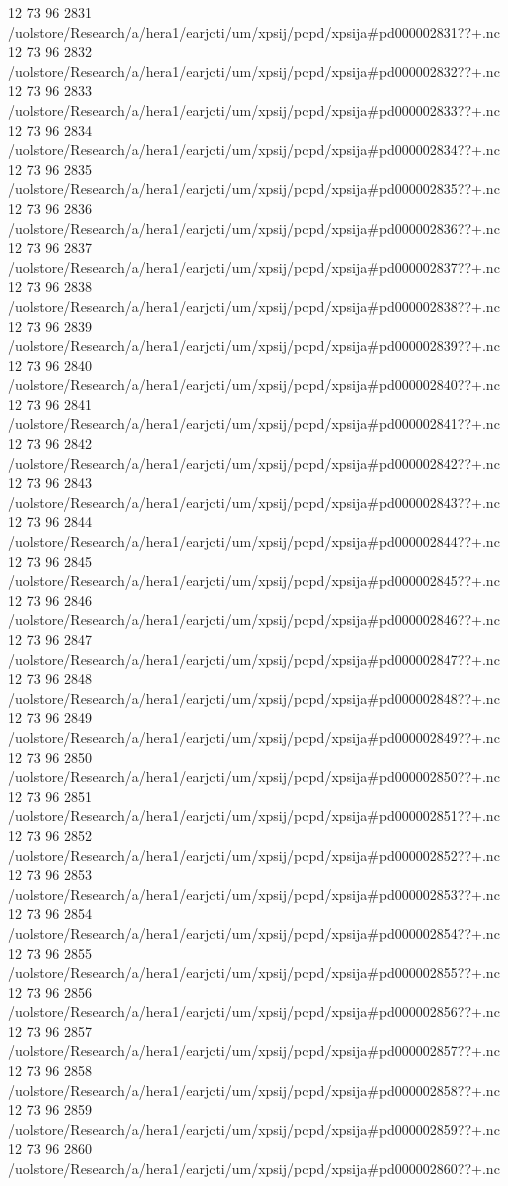 12 73 96
2831
/uolstore/Research/a/hera1/earjcti/um/xpsij/pcpd/xpsija#pd000002831??+.nc
12 73 96
2832
/uolstore/Research/a/hera1/earjcti/um/xpsij/pcpd/xpsija#pd000002832??+.nc
12 73 96
2833
/uolstore/Research/a/hera1/earjcti/um/xpsij/pcpd/xpsija#pd000002833??+.nc
12 73 96
2834
/uolstore/Research/a/hera1/earjcti/um/xpsij/pcpd/xpsija#pd000002834??+.nc
12 73 96
2835
/uolstore/Research/a/hera1/earjcti/um/xpsij/pcpd/xpsija#pd000002835??+.nc
12 73 96
2836
/uolstore/Research/a/hera1/earjcti/um/xpsij/pcpd/xpsija#pd000002836??+.nc
12 73 96
2837
/uolstore/Research/a/hera1/earjcti/um/xpsij/pcpd/xpsija#pd000002837??+.nc
12 73 96
2838
/uolstore/Research/a/hera1/earjcti/um/xpsij/pcpd/xpsija#pd000002838??+.nc
12 73 96
2839
/uolstore/Research/a/hera1/earjcti/um/xpsij/pcpd/xpsija#pd000002839??+.nc
12 73 96
2840
/uolstore/Research/a/hera1/earjcti/um/xpsij/pcpd/xpsija#pd000002840??+.nc
12 73 96
2841
/uolstore/Research/a/hera1/earjcti/um/xpsij/pcpd/xpsija#pd000002841??+.nc
12 73 96
2842
/uolstore/Research/a/hera1/earjcti/um/xpsij/pcpd/xpsija#pd000002842??+.nc
12 73 96
2843
/uolstore/Research/a/hera1/earjcti/um/xpsij/pcpd/xpsija#pd000002843??+.nc
12 73 96
2844
/uolstore/Research/a/hera1/earjcti/um/xpsij/pcpd/xpsija#pd000002844??+.nc
12 73 96
2845
/uolstore/Research/a/hera1/earjcti/um/xpsij/pcpd/xpsija#pd000002845??+.nc
12 73 96
2846
/uolstore/Research/a/hera1/earjcti/um/xpsij/pcpd/xpsija#pd000002846??+.nc
12 73 96
2847
/uolstore/Research/a/hera1/earjcti/um/xpsij/pcpd/xpsija#pd000002847??+.nc
12 73 96
2848
/uolstore/Research/a/hera1/earjcti/um/xpsij/pcpd/xpsija#pd000002848??+.nc
12 73 96
2849
/uolstore/Research/a/hera1/earjcti/um/xpsij/pcpd/xpsija#pd000002849??+.nc
12 73 96
2850
/uolstore/Research/a/hera1/earjcti/um/xpsij/pcpd/xpsija#pd000002850??+.nc
12 73 96
2851
/uolstore/Research/a/hera1/earjcti/um/xpsij/pcpd/xpsija#pd000002851??+.nc
12 73 96
2852
/uolstore/Research/a/hera1/earjcti/um/xpsij/pcpd/xpsija#pd000002852??+.nc
12 73 96
2853
/uolstore/Research/a/hera1/earjcti/um/xpsij/pcpd/xpsija#pd000002853??+.nc
12 73 96
2854
/uolstore/Research/a/hera1/earjcti/um/xpsij/pcpd/xpsija#pd000002854??+.nc
12 73 96
2855
/uolstore/Research/a/hera1/earjcti/um/xpsij/pcpd/xpsija#pd000002855??+.nc
12 73 96
2856
/uolstore/Research/a/hera1/earjcti/um/xpsij/pcpd/xpsija#pd000002856??+.nc
12 73 96
2857
/uolstore/Research/a/hera1/earjcti/um/xpsij/pcpd/xpsija#pd000002857??+.nc
12 73 96
2858
/uolstore/Research/a/hera1/earjcti/um/xpsij/pcpd/xpsija#pd000002858??+.nc
12 73 96
2859
/uolstore/Research/a/hera1/earjcti/um/xpsij/pcpd/xpsija#pd000002859??+.nc
12 73 96
2860
/uolstore/Research/a/hera1/earjcti/um/xpsij/pcpd/xpsija#pd000002860??+.nc
